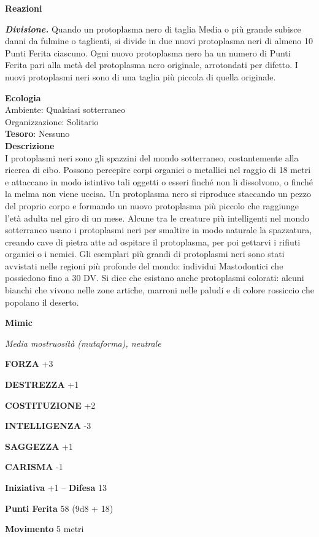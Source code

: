 \begin{multicols}{2}
\textbf{Reazioni}

\textit{\textbf{Divisione.}} Quando un protoplasma nero di taglia Media o più grande subisce danni da fulmine o taglienti, si divide in due nuovi protoplasma neri di almeno 10 Punti Ferita ciascuno. Ogni nuovo protoplasma nero ha un numero di Punti Ferita pari alla metà del protoplasma nero originale, arrotondati per difetto. I nuovi protoplasmi neri sono di una taglia più piccola di quella originale.

\textbf{Ecologia}\\
Ambiente: Qualsiasi sotterraneo\\
Organizzazione: Solitario\\
\textbf{Tesoro}: Nessuno\\
\textbf{Descrizione}\\
I protoplasmi neri sono gli spazzini del mondo sotterraneo, costantemente alla ricerca di cibo. Possono percepire corpi organici o metallici nel raggio di 18 metri e attaccano in modo istintivo tali oggetti o esseri finché non li dissolvono, o finché la melma non viene uccisa. Un protoplasma nero si riproduce staccando un pezzo del proprio corpo e formando un nuovo protoplasma più piccolo che raggiunge l'età adulta nel giro di un mese. Alcune tra le creature più intelligenti nel mondo sotterraneo usano i protoplasmi neri per smaltire in modo naturale la spazzatura, creando cave di pietra atte ad ospitare il protoplasma, per poi gettarvi i rifiuti organici o i nemici.
Gli esemplari più grandi di protoplasmi neri sono stati avvistati nelle regioni più profonde del mondo: individui Mastodontici che possiedono fino a 30 DV. Si dice che esistano anche protoplasmi colorati: alcuni bianchi che vivono nelle zone artiche, marroni nelle paludi e di colore rossiccio che popolano il deserto.


\medskip{}\textbf{Mimic}

\textit{Media mostruosità (mutaforma), neutrale}

\textbf{FORZA} +3

\textbf{DESTREZZA} +1

\textbf{COSTITUZIONE} +2

\textbf{INTELLIGENZA} -3

\textbf{SAGGEZZA} +1

\textbf{CARISMA} -1

\textbf{Iniziativa} +1 -- \textbf{Difesa} 13

\textbf{Punti Ferita} 58 (9d8 + 18)

\textbf{Movimento} 5 metri


\end{multicols}
